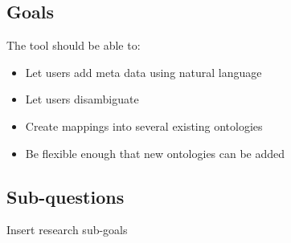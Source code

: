 \subsection{Goals}

The tool should be able to:
\begin{itemize}
	\item Let users add meta data using natural language
	\item Let users disambiguate
	\item Create mappings into several existing ontologies
	\item Be flexible enough that new ontologies can be added
\end{itemize}

\subsection{Sub-questions}
Insert research sub-goals
